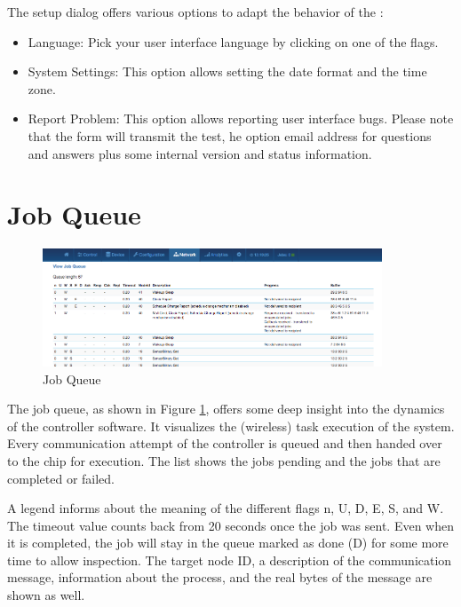 The setup dialog offers various options to adapt the behavior of the \zweui:

\begin{itemize}
\item Language: Pick your user interface language by clicking on one of the flags.
\item System Settings: This option allows setting the date format and the time zone.
\item Report Problem: This option allows reporting user interface bugs. Please note that 
the form will transmit the test, he option email address for questions and answers plus 
some internal version and status information.
\end{itemize}

\section{Job Queue}
\label{jobqueue}

\begin{figure}
\begin{center}
\includegraphics[width=0.9\textwidth]{pngs/cap7/eui28.png}
\caption{Job Queue}
\label{eui28}
\end{center}
\end{figure}

The job queue, as shown in Figure \ref{eui28}, offers some deep insight into the dynamics 
of the controller software. It visualizes the (wireless) task execution of the system. 
Every communication attempt of the controller is queued and then handed over to the \zwave 
chip for execution. The list shows the jobs pending and the jobs that are completed or failed.

A legend informs about the meaning of the different flags n, U, D, E, S, and W. The timeout 
value counts back from 20 seconds once the job was sent. Even when it is completed, the 
job will stay in the queue marked as done (D) for some more time to allow inspection. The 
target node ID, a description of the communication message, information about the process,
 and the real bytes of the message are shown as well.
